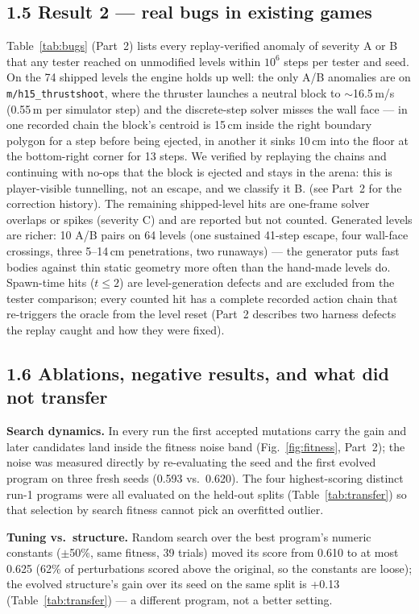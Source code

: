 \subsection*{1.5 Result 2 --- real bugs in existing games}
Table~\ref{tab:bugs} (Part~2) lists every replay-verified anomaly of severity A or B that any tester reached on unmodified levels within
$10^6$ steps per tester and seed. On the 74 shipped levels the engine holds up well: the only A/B anomalies are on
\texttt{m/h15\_thrustshoot}, where the thruster launches a neutral block to $\sim$16.5\,m/s (0.55\,m per simulator step) and the
discrete-step solver misses the wall face --- in one recorded chain the block's centroid is 15\,cm inside the right boundary polygon
for a step before being ejected, in another it sinks 10\,cm into the floor at the bottom-right corner for 13 steps. We verified by
replaying the chains and continuing with no-ops that the block is ejected and stays in the arena: this is player-visible tunnelling,
not an escape, and we classify it B. (see Part~2 for the correction history).
The remaining shipped-level hits are one-frame solver overlaps or spikes (severity C) and are reported but not counted.
Generated levels are richer: 10 A/B pairs on 64 levels (one sustained 41-step escape, four wall-face crossings, three 5--14\,cm
penetrations, two runaways) --- the generator puts fast bodies against thin static geometry more often than the hand-made levels do. Spawn-time hits
($t\le2$) are level-generation defects and are excluded from the tester comparison; every counted hit has a complete recorded action
chain that re-triggers the oracle from the level reset (Part~2 describes two harness defects the replay caught and how they were fixed).

\subsection*{1.6 Ablations, negative results, and what did not transfer}

\textbf{Search dynamics.} In every run the first accepted mutations carry the gain and later candidates land inside the fitness
noise band (Fig.~\ref{fig:fitness}, Part~2); the noise was measured directly by re-evaluating the seed and the first evolved program on
three fresh seeds (0.593 vs.\ 0.620). The four highest-scoring distinct run-1 programs were all evaluated on the held-out splits
(Table~\ref{tab:transfer}) so that selection by search fitness cannot pick an overfitted outlier.

\textbf{Tuning vs.\ structure.} Random search over the best program's numeric constants ($\pm$50\%, same fitness, 39 trials) moved its
score from 0.610 to at most 0.625 (62\% of perturbations scored above the original, so the constants are loose); the evolved
structure's gain over its seed on the same split is +0.13 (Table~\ref{tab:transfer}) --- a different program, not a better setting.

